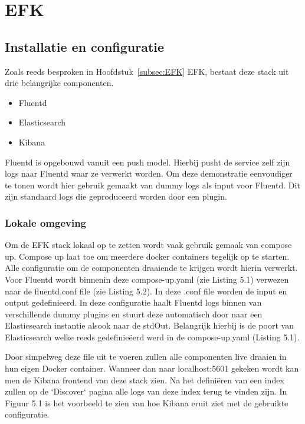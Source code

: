 
\chapter{EFK}
\label{ch:EFK}

\section{Installatie en configuratie}
Zoals reeds besproken in Hoofdstuk~\ref{subsec:EFK} EFK, bestaat deze stack uit drie belangrijke componenten.
\begin{itemize}
    \item Fluentd
    \item Elasticsearch
    \item Kibana
\end{itemize}
Fluentd is opgebouwd vanuit een push model. Hierbij pusht de service zelf zijn logs naar Fluentd waar ze verwerkt worden. Om deze demonstratie eenvoudiger te tonen wordt hier gebruik gemaakt van dummy logs als input voor Fluentd. Dit zijn standaard logs die geproduceerd worden door een plugin. 
\subsection{Lokale omgeving}
Om de EFK stack lokaal op te zetten wordt vaak gebruik gemaak van compose up. Compose up laat toe om meerdere docker containers tegelijk op te starten. Alle configuratie om de componenten draaiende te krijgen wordt hierin verwerkt. Voor Fluentd wordt binnenin deze compose-up.yaml (zie Listing 5.1) verwezen naar de fluentd.conf file (zie Listing 5.2). In deze .conf file worden de input en output gedefinieerd. In deze configuratie haalt Fluentd logs binnen van verschillende dummy plugins en stuurt deze automatisch door naar een Elasticsearch instantie alsook naar de stdOut. Belangrijk hierbij is de poort van Elasticsearch welke reeds gedefinieëerd werd in de compose-up.yaml (Listing 5.1).

Door simpelweg deze file uit te voeren zullen alle componenten live draaien in hun eigen Docker container. Wanneer dan naar localhost:5601 gekeken wordt kan men de Kibana frontend van deze stack zien. Na het definiëren van een index zullen op de `Discover` pagina  alle logs van deze index terug te vinden zijn. In Figuur 5.1 is het voorbeeld te zien van hoe Kibana eruit ziet met de gebruikte configuratie.

